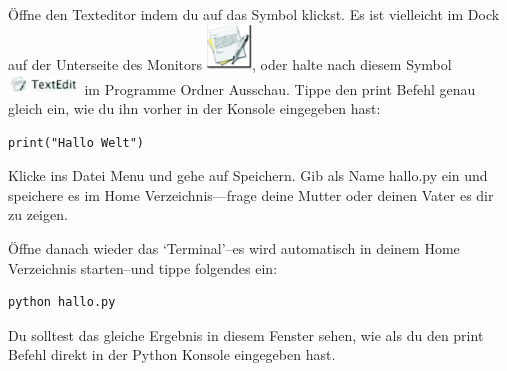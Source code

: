 \begin{MAC}
Öffne den Texteditor indem du auf das Symbol klickst. Es ist vielleicht im Dock auf der Unterseite des Monitors \includegraphics*[width=12mm]{images/textedit-icon}, oder halte nach diesem Symbol \includegraphics*[width=19mm]{images/textedit-icon2} im Programme Ordner Ausschau. Tippe den print Befehl genau gleich ein, wie du ihn vorher in der Konsole eingegeben hast:

\begin{Verbatim}[frame=single]
print("Hallo Welt")
\end{Verbatim}

Klicke ins Datei Menu und gehe auf Speichern. Gib als Name hallo.py ein und speichere es im Home Verzeichnis---frage deine Mutter oder deinen Vater es dir zu zeigen.

Öffne danach wieder das `Terminal'--es wird automatisch in deinem Home Verzeichnis starten--und tippe folgendes ein:

\begin{Verbatim}[frame=single]
python hallo.py
\end{Verbatim}

Du solltest das gleiche Ergebnis in diesem Fenster sehen, wie als du den print Befehl direkt in der Python Konsole eingegeben hast.

\end{MAC}

